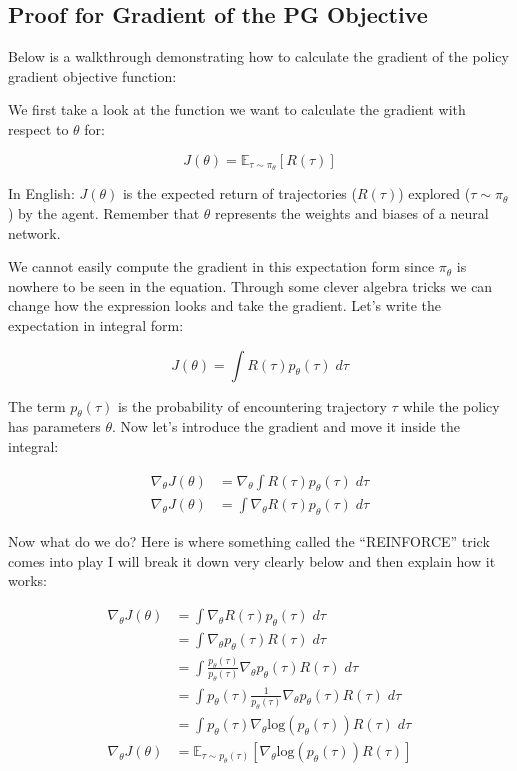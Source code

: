 \subsection{Proof for Gradient of the PG Objective}
\begin{flushleft}
    \large Below is a walkthrough demonstrating how to calculate the gradient of the policy gradient objective function: \break

    We first take a look at the function we want to calculate the gradient with respect to $\theta$ for:

    $$J(\theta) = \mathbb{E}_{\tau \sim \pi_\theta}[R(\tau)]$$

    In English: $J(\theta)$ is the expected return of trajectories ($R(\tau)$) explored ($\tau \sim \pi_\theta$) by the agent. Remember that $\theta$ represents the weights and biases of a neural network. \break
    
    We cannot easily compute the gradient in this expectation form since $\pi_\theta$ is nowhere to be seen in the equation. Through some clever algebra tricks we can change how the expression looks and take the gradient. Let's write the expectation in integral form: \break

    $$J(\theta) = \int R(\tau)p_{\theta}(\tau)\;d\tau$$

    The term $p_\theta(\tau)$ is the probability of encountering trajectory $\tau$ while the policy has parameters $\theta$. Now let's introduce the gradient and move it inside the integral:

    \begin{align*}
        \nabla_\theta J(\theta) &= \nabla_\theta\int R(\tau)p_{\theta}(\tau)\;d\tau \\
        \nabla_\theta J(\theta) &= \int \nabla_\theta R(\tau)p_{\theta}(\tau)\;d\tau
    \end{align*}
    
    Now what do we do? Here is where something called the ``REINFORCE'' trick comes into play I will break it down very clearly below and then explain how it works:

    \begin{align*}
        \nabla_\theta J(\theta) &= \int \nabla_\theta R(\tau)p_{\theta}(\tau)\;d\tau \\
        &= \int \nabla_\theta p_{\theta}(\tau)R(\tau)\;d\tau \\
        &= \int \frac{p_{\theta}(\tau)}{p_{\theta}(\tau)}\nabla_\theta p_{\theta}(\tau) R(\tau)\;d\tau \\
        &= \int p_{\theta}(\tau)\frac{1}{p_{\theta}(\tau)}\nabla_\theta p_{\theta}(\tau) R(\tau)\;d\tau \\
        &= \int p_{\theta}(\tau) \nabla_\theta \mathrm{log}(p_\theta(\tau)) R(\tau)\;d\tau \\
        \nabla_\theta J(\theta) &= \mathbb{E}_{\tau \sim p_\theta(\tau)}[\nabla_\theta \mathrm{log}(p_\theta(\tau)) R(\tau)] 
    \end{align*}


\end{flushleft}
